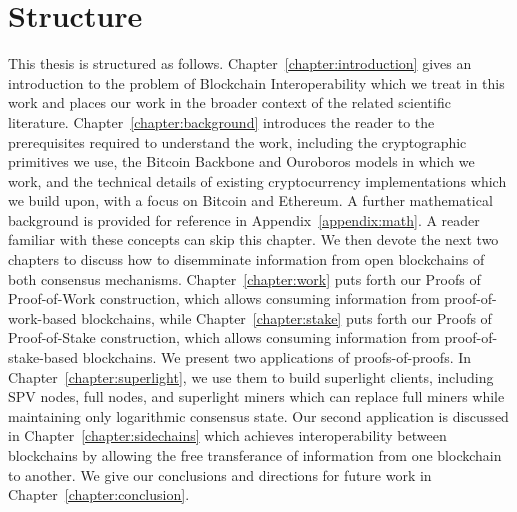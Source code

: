 \section*{Structure}

This thesis is structured as follows. Chapter~\ref{chapter:introduction} gives
an introduction to the problem of Blockchain Interoperability which we treat in
this work and places our work in the broader context of the related scientific
literature. Chapter~\ref{chapter:background} introduces the reader to the
prerequisites required to understand the work, including the cryptographic
primitives we use, the Bitcoin Backbone and Ouroboros models in which we work, and the
technical details of existing cryptocurrency implementations which we build
upon, with a focus on Bitcoin and Ethereum. A further mathematical background is
provided for reference in Appendix~\ref{appendix:math}. A reader familiar with
these concepts can skip this chapter. We then devote the next two chapters to
discuss how to disemminate information from open blockchains of both consensus
mechanisms. Chapter~\ref{chapter:work} puts forth our Proofs of Proof-of-Work
construction, which allows consuming information from proof-of-work-based
blockchains, while Chapter~\ref{chapter:stake} puts forth our Proofs of
Proof-of-Stake construction, which allows consuming information from
proof-of-stake-based blockchains. We present two applications of
proofs-of-proofs. In Chapter~\ref{chapter:superlight}, we use them to build
superlight clients, including SPV nodes, full nodes, and superlight miners which
can replace full miners while maintaining only logarithmic consensus state. Our
second application is discussed in Chapter~\ref{chapter:sidechains} which
achieves interoperability between blockchains by allowing the free transferance
of information from one blockchain to another. We give our conclusions and
directions for future work in Chapter~\ref{chapter:conclusion}.
